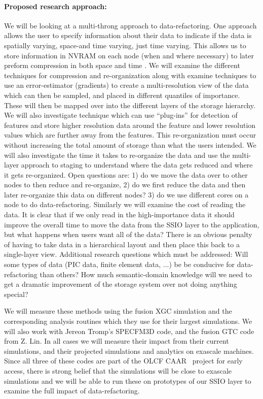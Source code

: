 \paragraph{Proposed research approach:} 
We will be looking at a multi-throng approach to data-refactoring. One approach allows the user to specify information about their data
to indicate if the data is spatially varying, space-and time varying, just time varying. This allows us to store information in NVRAM on each
node (when and where necessary) to later preform compression in both space and time . We will examine the different techniques for
compression and re-organization along with examine techniques to use an error-estimator (gradients) to create a multi-resolution view of the
data which can then be sampled, and placed in different quantiles of importance. These will then be mapped over into the different layers of 
the storage hierarchy.  We will also investigate technique which can use ``plug-ins'' for detection of features and store higher resolution data
around the feature and lower resolution values which are further away from the features. This re-organization must occur without increasing the
total amount of storage than what the users intended. We will also investigate the time it takes to re-organize the data and use the multi-layer
approach to staging to understand where the data gets reduced and where it gets re-organized. Open questions are: 1) do we move the
data over to other nodes to then reduce and re-organize, 2) do we first reduce the data and then later re-organize this data on different nodes?
3) do we use different cores on a node to do data-refactoring. Similarly we will examine the cost of reading the data. It is clear that if we only
read in the high-importance data it should improve the overall time to move the data from the SSIO layer to the application, but what happens
when users want all of the data? There is an obvious penalty of having to take data in a hierarchical layout and then place this back to
a single-layer view.  Additional research questions which must be addressed: Will some types of data (PIC data, finite element data, ...) be
be conducive  for data-refactoring than others? How much semantic-domain knowledge will we need to get a dramatic improvement of the storage
system over not doing anything special? 

We will measure these methods using the fusion XGC simulation and the corresponding analysis routines which they use for their largest
simulations. We will also work with Jereon Tromp's SPECFM3D code, and the fusion GTC code from Z. Lin. In all cases
we will measure their impact from their current simulations, and their projected simulations and analytics on exascale machines. Since 
all three of these codes are part of the OLCF CAAR~\cite{CAAR} project for early access, there is strong belief that the simulations will
be close to exascale simulations and we will be able to run these on prototypes of our SSIO layer to examine the full impact of data-refactoring.

